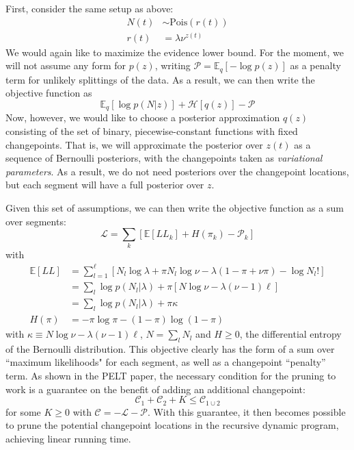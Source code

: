 \documentclass[11pt]{article}
\begin{document}
First, consider the same setup as above:
\begin{align}
    N(t) &\sim \mathrm{Pois}(r(t)) \\
    r(t) &= \lambda \nu^{z(t)}
\end{align}
We would again like to maximize the evidence lower bound. For the moment, we will not assume any form for $p(z)$, writing $\mathcal{P} = \mathbb{E}_q[-\log p(z)]$ as a penalty term for unlikely splittings of the data. As a result, we can then write the objective function as
\begin{equation}
    \mathbb{E}_q \left[\log p(N|z) \right] + \mathcal{H}[q(z)] - \mathcal{P}
\end{equation}
Now, however, we would like to choose a posterior approximation $q(z)$ consisting of the set of binary, piecewise-constant functions with fixed changepoints. That is, we will approximate the posterior over $z(t)$ as a sequence of Bernoulli posteriors, with the changepoints taken as \emph{variational parameters}. As a result, we do not need posteriors over the changepoint locations, but each segment will have a full posterior over $z$.

Given this set of assumptions, we can then write the objective function as a sum over segments:
\begin{equation}
    \label{objective}
    \mathcal{L} = \sum_k \left[
    \mathbb{E}[LL_k] + H(\pi_k)
    - \mathcal{P}_k
    \right]
\end{equation}
with
\begin{align}
    \mathbb{E}[LL] &= \sum_{l = 1}^\ell [N_l \log \lambda + \pi N_l \log \nu - \lambda (1 - \pi + \nu \pi) - \log N_l! ]\\
    &= \sum_l \log p(N_l|\lambda) + \pi [N\log \nu - \lambda (\nu - 1) \ell] \\
    &= \sum_l \log p(N_l|\lambda) + \pi \kappa \\
    H(\pi) &= -\pi \log \pi - (1 - \pi) \log (1 - \pi)
\end{align}
with $\kappa \equiv N\log \nu - \lambda (\nu - 1)\ell$, $N = \sum_l N_l$ and $H \ge 0$, the differential entropy of the Bernoulli distribution. This objective clearly has the form of a sum over ``maximum likelihoods" for each segment, as well as a changepoint ``penalty'' term. As shown in the PELT paper, the necessary condition for the pruning to work is a guarantee on the benefit of adding an additional changepoint:
\begin{equation}
    \label{pelt_condition}
    \mathcal{C}_1 + \mathcal{C}_2 + K \le \mathcal{C}_{1 \cup 2}
\end{equation}
for some $K \ge 0$ with $\mathcal{C} = -\mathcal{L} - \mathcal{P}$. With this guarantee, it then becomes possible to prune the potential changepoint locations in the recursive dynamic program, achieving linear running time.
\end{document}
